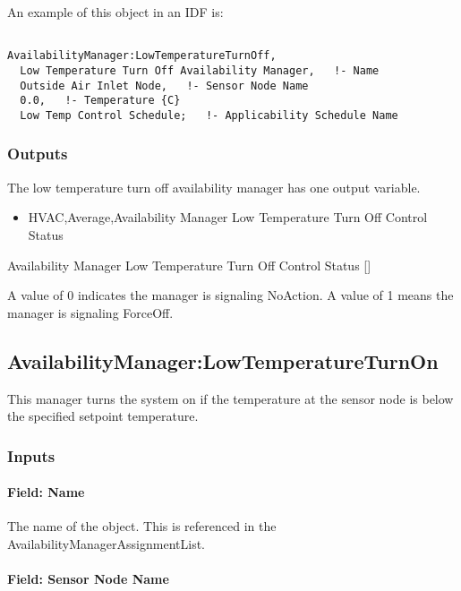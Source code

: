 An example of this object in an IDF is:

\begin{lstlisting}

AvailabilityManager:LowTemperatureTurnOff,
  Low Temperature Turn Off Availability Manager,   !- Name
  Outside Air Inlet Node,   !- Sensor Node Name
  0.0,   !- Temperature {C}
  Low Temp Control Schedule;   !- Applicability Schedule Name
\end{lstlisting}

\subsubsection{Outputs}\label{outputs-6-010}

The low temperature turn off availability manager has one output variable.

\begin{itemize}
\tightlist
\item
  HVAC,Average,Availability Manager Low Temperature Turn Off Control Status
\end{itemize}

Availability Manager Low Temperature Turn Off Control Status {[]}

A value of 0 indicates the manager is signaling NoAction. A value of 1 means the manager is signaling ForceOff.

\subsection{AvailabilityManager:LowTemperatureTurnOn}\label{availabilitymanagerlowtemperatureturnon}

This manager turns the system on if the temperature at the sensor node is below the specified setpoint temperature.

\subsubsection{Inputs}\label{inputs-8-025}

\paragraph{Field: Name}\label{field-name-7-021}

The name of the object. This is referenced in the AvailabilityManagerAssignmentList.

\paragraph{Field: Sensor Node Name}\label{field-sensor-node-name-3}


